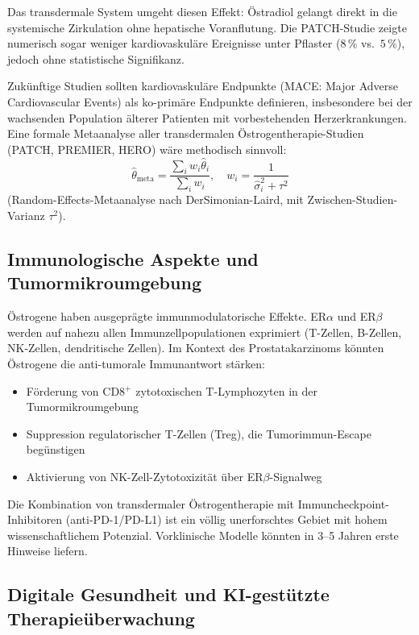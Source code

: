 ﻿\documentclass[a4paper,12pt]{article}
\theoremstyle{definition}
\begin{document}
Das transdermale System umgeht diesen Effekt: Östradiol gelangt direkt in die systemische Zirkulation ohne hepatische Voranflutung.
Die PATCH-Studie zeigte numerisch sogar weniger kardiovaskuläre Ereignisse unter Pflaster ($8\,\%$ vs.\ $5\,\%$), jedoch ohne statistische Signifikanz.

Zukünftige Studien sollten kardiovaskuläre Endpunkte (MACE: Major Adverse Cardiovascular Events) als ko-primäre Endpunkte definieren, insbesondere bei der wachsenden Population älterer Patienten mit vorbestehenden Herzerkrankungen.
Eine formale Metaanalyse aller transdermalen Östrogentherapie-Studien (PATCH, PREMIER, HERO) wäre methodisch sinnvoll:
\begin{equation}
  \hat{\theta}_{\mathrm{meta}} = \frac{\sum_i w_i \hat{\theta}_i}{\sum_i w_i}, \quad w_i = \frac{1}{\hat{\sigma}_i^2 + \tau^2}
\end{equation}
(Random-Effects-Metaanalyse nach DerSimonian-Laird, mit Zwischen-Studien-Varianz $\tau^2$).

\subsection{Immunologische Aspekte und Tumormikroumgebung}

Östrogene haben ausgeprägte immunmodulatorische Effekte.
ER$\alpha$ und ER$\beta$ werden auf nahezu allen Immunzellpopulationen exprimiert (T-Zellen, B-Zellen, NK-Zellen, dendritische Zellen).
Im Kontext des Prostatakarzinoms könnten Östrogene die anti-tumorale Immunantwort stärken:
\begin{itemize}
  \item Förderung von CD8$^+$ zytotoxischen T-Lymphozyten in der Tumormikroumgebung
  \item Suppression regulatorischer T-Zellen (Treg), die Tumorimmun-Escape begünstigen
  \item Aktivierung von NK-Zell-Zytotoxizität über ER$\beta$-Signalweg
\end{itemize}

Die Kombination von transdermaler Östrogentherapie mit Immuncheckpoint-Inhibitoren (anti-PD-1/PD-L1) ist ein völlig unerforschtes Gebiet mit hohem wissenschaftlichem Potenzial.
Vorklinische Modelle könnten in 3--5 Jahren erste Hinweise liefern.

\subsection{Digitale Gesundheit und KI-gestützte Therapieüberwachung}
\end{document}
